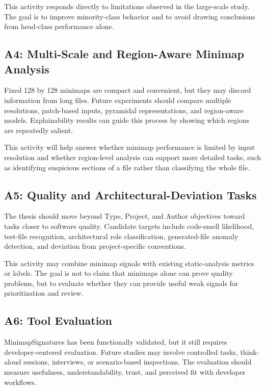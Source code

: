This activity responds directly to limitations observed in the large-scale
study. The goal is to improve minority-class behavior and to avoid drawing
conclusions from head-class performance alone.

\subsection{A4: Multi-Scale and Region-Aware Minimap Analysis}

Fixed 128 by 128 minimaps are compact and convenient, but they may discard
information from long files. Future experiments should compare multiple
resolutions, patch-based inputs, pyramidal representations, and region-aware
models. Explainability results can guide this process by showing which regions
are repeatedly salient.

This activity will help answer whether minimap performance is limited by input
resolution and whether region-level analysis can support more detailed tasks,
such as identifying suspicious sections of a file rather than classifying the
whole file.

\subsection{A5: Quality and Architectural-Deviation Tasks}

The thesis should move beyond Type, Project, and Author objectives toward tasks
closer to software quality. Candidate targets include code-smell likelihood,
test-file recognition, architectural role classification, generated-file
anomaly detection, and deviation from project-specific conventions.

This activity may combine minimap signals with existing static-analysis metrics
or labels. The goal is not to claim that minimaps alone can prove quality
problems, but to evaluate whether they can provide useful weak signals for
prioritization and review.

\subsection{A6: Tool Evaluation}

MinimapSignatures has been functionally validated, but it still requires
developer-centered evaluation. Future studies may involve controlled tasks,
think-aloud sessions, interviews, or scenario-based inspections. The evaluation
should measure usefulness, understandability, trust, and perceived fit with
developer workflows.

